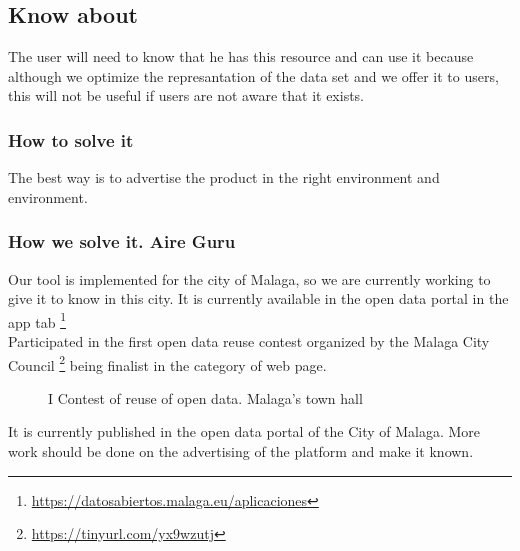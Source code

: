 \subsection{Know about}

The user will need to know that he has this resource and can use it because although we optimize the represantation of the
data set and we offer it to users, this will not be useful if users are not aware that it exists.

\subsubsection{How to solve it} 
The best way is to advertise the product in the right environment and environment.
\subsubsection{How we solve it. Aire Guru} 
Our tool is implemented for the city of Malaga, so we are currently working to give it to
know in this city.
It is currently available in the open data portal in the app tab \footnote {\url {https://datosabiertos.malaga.eu/aplicaciones}} \\
Participated in the first open data reuse contest organized by the Malaga City Council \footnote {\url {https://tinyurl.com/yx9wzutj}}
being finalist in the category of web page.


\begin{figure}[ht]
    \centering
   \hfill
 
    \caption{I Contest of reuse of open data. Malaga's town hall}
    \end{figure}

\begin{itemize}
    \done It is currently published in the open data portal of the City of Malaga.
\crossed More work should be done on the advertising of the platform and make it known.
\end{itemize}
\newpage